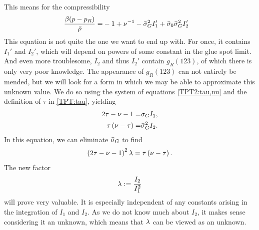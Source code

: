 \documentclass[8.5pt,twoside,twocolumn]{article}
\theoremstyle{standard}
\begin{document}
This means for the compressibility
\begin{equation}
\begin{aligned}
\frac{\beta(p-p_R)}{\bar\rho}=&-1+\nu^{-1}-\bar\sigma_G^2 I_1'+\bar\sigma_0\bar\sigma_G^2 I_2'
\end{aligned}
\label{TPT2:exccessP:simple}
\end{equation}
This equation is not quite the one we want to end up with. For once, it
contains $I_1'$ and $I_2'$, which will depend on powers of some constant in the glue spot limit.
And even more troublesome, $I_2$ and thus $I_2'$ contain $g_R(123)$, of which
there is only very poor knowledge. The appearance of $g_R(123)$ can not
entirely be mended, but we will look for a form in which we may be able
to approximate this unknown value. We do so using the system of equations
\eqref{TPT2:tau,nu} and the definition of $\tau$ in \eqref{TPT:tau}, yielding
\begin{equation}
\begin{aligned}
2\tau-\nu-1=&\bar\sigma_G I_1,\\
\tau\left({\nu-\tau}\right)=&\bar\sigma_G^2 I_2.
\end{aligned}
\end{equation}
In this equation, we can eliminate $\bar\sigma_G$ to find
\begin{equation}
\left({2\tau-\nu-1}\right)^2 \lambda = \tau\left({\nu-\tau}\right).
\label{TPT2:solvingLGS} 
\end{equation} 
The new factor
\begin{equation}
\lambda:=\frac {I_2} {I_1^2}
\label{TPT2:la}
\end{equation}
will prove very valuable. It is especially independent of any constants arising
in the integration of $I_1$ and $I_2$. As we do not know much about $I_2$, it makes
sense considering it an unknown, which means that $\lambda$ can be viewed as an unknown.
\end{document}

